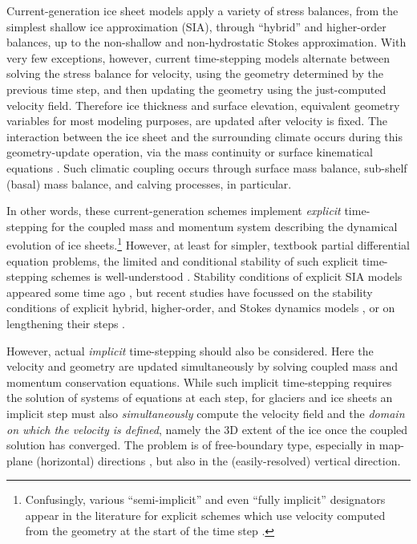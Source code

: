 \documentclass[review,letterpaper]{igs}
\begin{document}
Current-generation ice sheet models apply a variety of stress balances, from the simplest shallow ice approximation (SIA), through ``hybrid'' \citep{Robinsonetal2022,Winkelmannetal2011} and higher-order balances, up to the non-shallow and non-hydrostatic Stokes approximation.  With very few exceptions, however, current time-stepping models alternate between solving the stress balance for velocity, using the geometry determined by the previous time step, and then updating the geometry using the just-computed velocity field.  Therefore ice thickness and surface elevation, equivalent geometry variables for most modeling purposes, are updated after velocity is fixed.  The interaction between the ice sheet and the surrounding climate occurs during this geometry-update operation, via the mass continuity or surface kinematical equations \citep{GreveBlatter2009}.  Such climatic coupling occurs through surface mass balance, sub-shelf (basal) mass balance, and calving processes, in particular.

In other words, these current-generation schemes implement \emph{explicit} time-stepping for the coupled mass and momentum system describing the dynamical evolution of ice sheets.\footnote{Confusingly, various ``semi-implicit'' and even ``fully implicit'' designators appear in the literature for explicit schemes which use velocity computed from the geometry at the start of the time step \citep[for example]{Chengetal2017}.}  However, at least for simpler, textbook partial differential equation problems, the limited and conditional stability of such explicit time-stepping schemes is well-understood \citep{LeVeque2007}.  Stability conditions of explicit SIA models appeared some time ago \citep[e.g.][]{HindmarshPayne1996}, but recent studies have focussed on the stability conditions of explicit hybrid, higher-order, and Stokes dynamics models \citep{Chengetal2017,Robinsonetal2022}, or on lengthening their steps \citep{LofgrenAhlkronaHelanow2021}.

However, actual \emph{implicit} time-stepping \citep{LeVeque2007} should also be considered.  Here the velocity and geometry are updated simultaneously by solving coupled mass and momentum conservation equations.  While such implicit time-stepping requires the solution of systems of equations at each step, for glaciers and ice sheets an implicit step must also \emph{simultaneously} compute the velocity field and the \emph{domain on which the velocity is defined}, namely the 3D extent of the ice once the coupled solution has converged.  The problem is of free-boundary type, especially in map-plane (horizontal) directions \citep{SchoofHewitt2013}, but also in the (easily-resolved) vertical direction.
\end{document}
